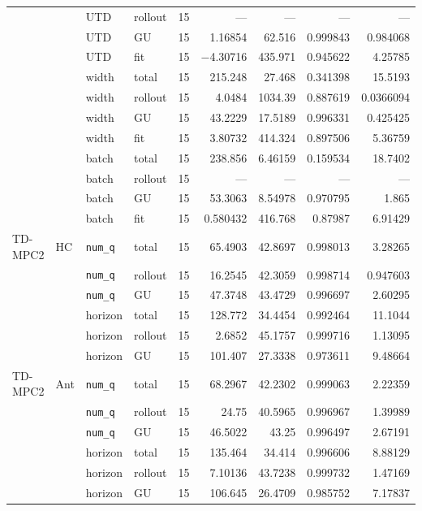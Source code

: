 {\begin{longtable}{@{}llllrrrrr@{}}
     &  & UTD & rollout & \num{15} & --- & --- & --- & --- \\
     &  & UTD & GU & \num{15} & \num{1.16854} & \num{62.516} & \num{0.999843} & \num{0.984068} \\
     &  & UTD & fit & \num{15} & \num{-4.30716} & \num{435.971} & \num{0.945622} & \num{4.25785} \\
     &  & width & total & \num{15} & \num{215.248} & \num{27.468} & \num{0.341398} & \num{15.5193} \\
     &  & width & rollout & \num{15} & \num{4.0484} & \num{1034.39} & \num{0.887619} & \num{0.0366094} \\
     &  & width & GU & \num{15} & \num{43.2229} & \num{17.5189} & \num{0.996331} & \num{0.425425} \\
     &  & width & fit & \num{15} & \num{3.80732} & \num{414.324} & \num{0.897506} & \num{5.36759} \\
     &  & batch & total & \num{15} & \num{238.856} & \num{6.46159} & \num{0.159534} & \num{18.7402} \\
     &  & batch & rollout & \num{15} & --- & --- & --- & --- \\
     &  & batch & GU & \num{15} & \num{53.3063} & \num{8.54978} & \num{0.970795} & \num{1.865} \\
     &  & batch & fit & \num{15} & \num{0.580432} & \num{416.768} & \num{0.87987} & \num{6.91429} \\
    \midrule
    TD-MPC2 & HC & \texttt{num\_q} & total & \num{15} & \num{65.4903} & \num{42.8697} & \num{0.998013} & \num{3.28265} \\
     &  & \texttt{num\_q} & rollout & \num{15} & \num{16.2545} & \num{42.3059} & \num{0.998714} & \num{0.947603} \\
     &  & \texttt{num\_q} & GU & \num{15} & \num{47.3748} & \num{43.4729} & \num{0.996697} & \num{2.60295} \\
     &  & horizon & total & \num{15} & \num{128.772} & \num{34.4454} & \num{0.992464} & \num{11.1044} \\
     &  & horizon & rollout & \num{15} & \num{2.6852} & \num{45.1757} & \num{0.999716} & \num{1.13095} \\
     &  & horizon & GU & \num{15} & \num{101.407} & \num{27.3338} & \num{0.973611} & \num{9.48664} \\
    TD-MPC2 & Ant & \texttt{num\_q} & total & \num{15} & \num{68.2967} & \num{42.2302} & \num{0.999063} & \num{2.22359} \\
     &  & \texttt{num\_q} & rollout & \num{15} & \num{24.75} & \num{40.5965} & \num{0.996967} & \num{1.39989} \\
     &  & \texttt{num\_q} & GU & \num{15} & \num{46.5022} & \num{43.25} & \num{0.996497} & \num{2.67191} \\
     &  & horizon & total & \num{15} & \num{135.464} & \num{34.414} & \num{0.996606} & \num{8.88129} \\
     &  & horizon & rollout & \num{15} & \num{7.10136} & \num{43.7238} & \num{0.999732} & \num{1.47169} \\
     &  & horizon & GU & \num{15} & \num{106.645} & \num{26.4709} & \num{0.985752} & \num{7.17837} \\
  \end{longtable}
}
